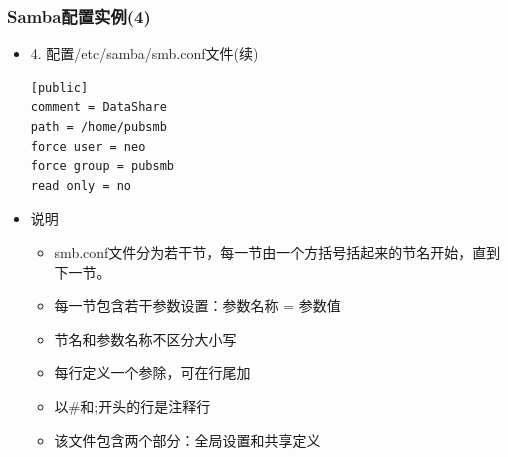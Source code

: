 \documentclass[xcolor=svgnames,presentation]{beamer}
\begin{document}
\begin{frame}[fragile]
\frametitle{Samba配置实例(4)}
\label{sec-2-9}
\begin{itemize}

\item 4. 配置/etc/samba/smb.conf文件(续)\\
\label{sec-2-9-1}%
\begin{verbatim}
[public]
comment = DataShare
path = /home/pubsmb
force user = neo
force group = pubsmb
read only = no
\end{verbatim}

\item 说明
\label{sec-2-9-2}%
\begin{itemize}

\item smb.conf文件分为若干节，每一节由一个方括号括起来的节名开始，直到下一节。
\label{sec-2-9-2-1}%

\item 每一节包含若干参数设置：参数名称 = 参数值
\label{sec-2-9-2-2}%

\item 节名和参数名称不区分大小写
\label{sec-2-9-2-3}%

\item 每行定义一个参除，可在行尾加
\label{sec-2-9-2-4}%

\item 以\#和;开头的行是注释行
\label{sec-2-9-2-5}%

\item 该文件包含两个部分：全局设置和共享定义
\label{sec-2-9-2-6}%
\end{itemize} %
\end{itemize} %
\end{frame}
\end{document}
